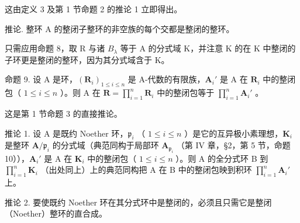 这由定义 3 及第 1 节命题 2 的推论 1 立即得出。

推论. 整环 A 的整闭子整环的非空族的每个交都是整闭的整环。

只需应用命题 8，取 R 与诸 \(B_{\lambda}\) 等于 A 的分式域 K，并注意 K 的在 K 中整闭的子环更是整闭的整环，因为其分式域含于 K。

命题 9. 设 A 是环，\((\mathbf{R}_i)_{1 \leqslant i \leqslant n}\) 是 A-代数的有限族，\(\mathbf{A}_i'\) 是 A 在 \(\mathbf{R}_i\) 中的整闭包（ \(1 \leqslant i \leqslant n\) ）。则 A 在 \(\mathbf{R} = \prod_{i=1}^{n} \mathbf{R}_i\) 中的整闭包等于 \(\prod_{i=1}^{n} \mathbf{A}_i'\) 。

这是第 1 节命题 3 的直接推论。

推论 1. 设 A 是既约 Noether 环，\(\mathfrak{p}_i\) （ \(1 \leqslant i \leqslant n\) ）是它的互异极小素理想，\(\mathbf{K}_i\) 是整环 \(\mathbf{A} / \mathfrak{p}_i\) 的分式域（典范同构于局部环 \(\mathbf{A}_{\mathfrak{p}_i}\) （第 IV 章，§2，第 5 节，命题 10）），\(\mathbf{A}_i'\) 是 A 在 \(\mathbf{K}_i\) 中的整闭包（ \(1 \leqslant i \leqslant n\) ）。则 A 的全分式环 B 到 \(\prod_{i=1}^{n} \mathbf{K}_i\) （出处同上）上的典范同构把 A 在 B 中的整闭包映到积环 \(\prod_{i=1}^{n} \mathbf{A}_i'\) 上。

推论 2. 要使既约 Noether 环在其分式环中是整闭的，必须且只需它是整闭（Noether）整环的直合成。

